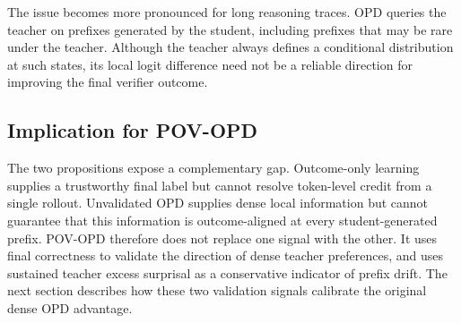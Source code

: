 The issue becomes more pronounced for long reasoning traces. OPD queries the teacher on prefixes generated by the student, including prefixes that may be rare under the teacher. Although the teacher always defines a conditional distribution at such states, its local logit difference need not be a reliable direction for improving the final verifier outcome.

\subsection{Implication for POV-OPD}

The two propositions expose a complementary gap. Outcome-only learning supplies a trustworthy final label but cannot resolve token-level credit from a single rollout. Unvalidated OPD supplies dense local information but cannot guarantee that this information is outcome-aligned at every student-generated prefix. POV-OPD therefore does not replace one signal with the other. It uses final correctness to validate the direction of dense teacher preferences, and uses sustained teacher excess surprisal as a conservative indicator of prefix drift. The next section describes how these two validation signals calibrate the original dense OPD advantage.
